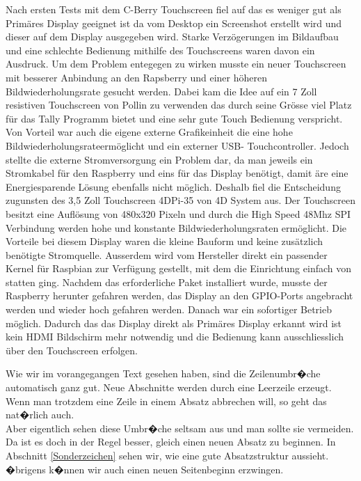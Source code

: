 \documentclass[11pt,a4paper]{article} %
\begin{document}
\par
Nach ersten Tests mit dem C-Berry Touchscreen fiel auf das es weniger gut als Prim\"ares Display geeignet ist da vom Desktop ein Screenshot erstellt wird und dieser auf dem Display  ausgegeben wird. Starke Verz\"ogerungen im Bildaufbau und eine schlechte Bedienung mithilfe des Touchscreens waren davon ein Ausdruck.
Um dem Problem entegegen zu wirken musste ein neuer Touchscreen mit besserer Anbindung an den Rapsberry und einer h\"oheren Bildwiederholungsrate gesucht werden. Dabei kam die Idee auf ein 7 Zoll resistiven Touchscreen von Pollin zu verwenden das durch seine Gr\"osse viel Platz f\"ur das Tally Programm bietet und eine sehr gute Touch Bedienung verspricht. Von Vorteil war auch die eigene externe Grafikeinheit die eine hohe Bildwiederholungsrateerm\"oglicht  und ein externer USB- Touchcontroller. Jedoch stellte die externe Stromversorgung ein Problem dar, da man jeweils ein Stromkabel f\"ur den Raspberry und eins f\"ur das Display ben\"otigt, damit \"are eine Energiesparende L\"osung ebenfalls nicht m\"oglich.
Deshalb fiel die Entscheidung zugunsten des 3,5 Zoll Touchscreen 4DPi-35 von 4D System aus. Der Touchscreen besitzt eine Aufl\"osung von 480x320 Pixeln und durch die High Speed 48Mhz SPI Verbindung werden hohe und konstante Bildwiederholungsraten erm\"oglicht.
Die Vorteile bei diesem Display waren die kleine Bauform und keine zus\"atzlich ben\"otigte Stromquelle. Ausserdem wird vom Hersteller direkt ein passender Kernel f\"ur Raspbian zur Verf\"ugung gestellt, mit dem die Einrichtung einfach von statten ging. Nachdem das erforderliche Paket installiert wurde, musste der Raspberry herunter gefahren werden,  das Display an den GPIO-Ports angebracht werden und wieder hoch gefahren werden. Danach war ein sofortiger Betrieb m\"oglich. Dadurch das das Display direkt als Prim\"ares Display erkannt wird ist kein HDMI Bildschirm mehr notwendig und die Bedienung kann ausschliesslich \"uber den Touchscreen erfolgen.


Wie wir im vorangegangen Text gesehen haben, sind die Zeilenumbr�che automatisch ganz gut. Neue Abschnitte werden durch eine Leerzeile erzeugt. Wenn man trotzdem eine Zeile in einem Absatz abbrechen will, so geht das nat�rlich auch. \\  Aber eigentlich sehen diese Umbr�che seltsam aus und man sollte sie vermeiden. Da ist es doch in der Regel besser, gleich einen neuen Absatz zu beginnen. In Abschnitt \ref{Sonderzeichen} sehen wir, wie eine gute Absatzstruktur aussieht. �brigens k�nnen wir auch einen neuen Seitenbeginn erzwingen.
\end{document}
